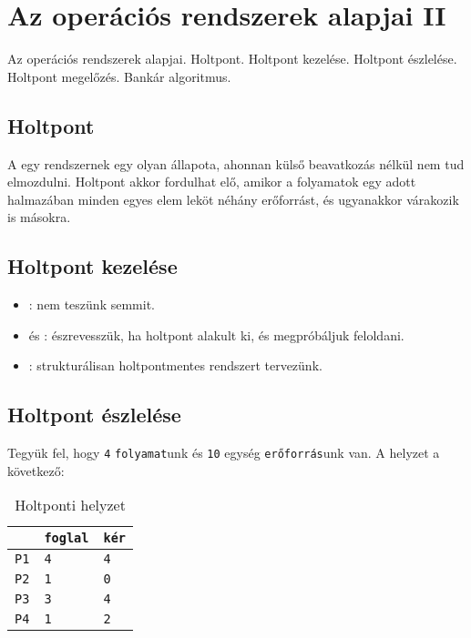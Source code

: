 \documentclass[../main.tex]{subfiles}
\begin{document}
\section{Az operációs rendszerek alapjai II}

\begin{fulltheorem}
	Az operációs rendszerek alapjai. Holtpont. Holtpont kezelése.
	Holtpont észlelése. Holtpont megelőzés. Bankár algoritmus.
\end{fulltheorem}

\subsection{Holtpont}

A  egy rendszernek egy olyan állapota, ahonnan külső beavatkozás
nélkül nem tud elmozdulni. Holtpont akkor fordulhat elő, amikor a folyamatok
egy adott halmazában minden egyes elem leköt néhány erőforrást, és ugyanakkor
várakozik is másokra.

\subsection{Holtpont kezelése}

\begin{itemize}
	\item {}:
	      nem teszünk semmit.

	\item {} és :
	      észrevesszük, ha holtpont alakult ki, és megpróbáljuk feloldani.

	\item {}:
	      strukturálisan holtpontmentes rendszert tervezünk.
\end{itemize}

\subsection{Holtpont észlelése}

Tegyük fel, hogy \texttt{4} \texttt{folyamat}unk és \texttt{10}
egység \texttt{erőforrás}unk van. A helyzet a következő:
\begin{table}[H]
	\centering\begin{tabular}{|p{1.5cm} |p{1.5cm} |p{1.5cm} |}
		\hline
		                       & \texttt{foglal} & \texttt{kér}
		\\ \hline
		\texttt{\color{red}P1} & \texttt{4}      & \texttt{\color{red}4} \\
		\texttt{P2}            & \texttt{1}      & \texttt{0}            \\
		\texttt{\color{red}P3} & \texttt{3}      & \texttt{\color{red}4} \\
		\texttt{P4}            & \texttt{1}      & \texttt{2}            \\
		\hline
	\end{tabular}
	\caption{Holtponti helyzet}
	\label{table:deadlock}
\end{table}
\end{document}
